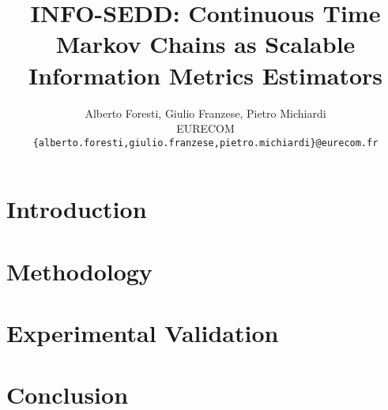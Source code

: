 \documentclass{article} %
\title{INFO-SEDD: Continuous Time Markov Chains as Scalable Information Metrics Estimators}
\author{Alberto Foresti, Giulio Franzese, Pietro Michiardi \\ EURECOM\\
\texttt{\{alberto.foresti,giulio.franzese,pietro.michiardi\}@eurecom.fr}
}
\begin{document}
\maketitle

\begin{abstract}

\end{abstract}

\section{Introduction}


\section{Methodology}\label{sec:method}


\section{\infosedd}\label{sec:infosed}


\section{Experimental Validation}


\section{Conclusion}





\appendix

\end{document}
